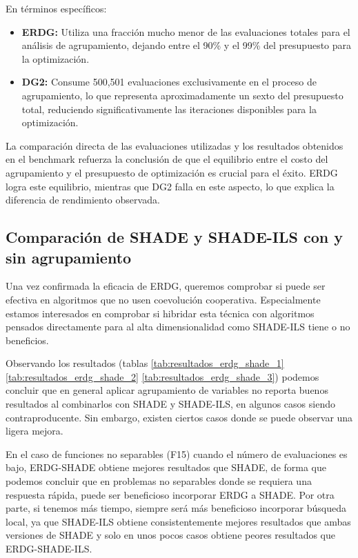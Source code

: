 En términos específicos:
\begin{itemize}
\item \textbf{ERDG:} Utiliza una fracción mucho menor de las evaluaciones totales para el análisis de agrupamiento, dejando entre el 90\% y el 99\% del presupuesto para la optimización.
\item \textbf{DG2:} Consume 500,501 evaluaciones exclusivamente en el proceso de agrupamiento, lo que representa aproximadamente un sexto del presupuesto total, reduciendo significativamente las iteraciones disponibles para la optimización.
\end{itemize}

La comparación directa de las evaluaciones utilizadas y los resultados obtenidos en el benchmark refuerza la conclusión de que el equilibrio entre el costo del agrupamiento y el presupuesto de optimización es crucial para el éxito. ERDG logra este equilibrio, mientras que DG2 falla en este aspecto, lo que explica la diferencia de rendimiento observada.

\subsection{Comparación de SHADE y SHADE-ILS con y sin agrupamiento}

Una vez confirmada la eficacia de ERDG, queremos comprobar si puede ser efectiva en algoritmos que no usen coevolución cooperativa. Especialmente estamos interesados en comprobar si hibridar esta técnica con algoritmos pensados directamente para al alta dimensionalidad como SHADE-ILS tiene o no beneficios.

Observando los resultados (tablas \ref{tab:resultados_erdg_shade_1} \ref{tab:resultados_erdg_shade_2} \ref{tab:resultados_erdg_shade_3}) podemos concluir que en general aplicar agrupamiento de variables no reporta buenos resultados al combinarlos con SHADE y SHADE-ILS, en algunos casos siendo contraproducente. Sin embargo, existen ciertos casos donde se puede observar una ligera mejora.

En el caso de funciones no separables (F15) cuando el número de evaluaciones es bajo, ERDG-SHADE obtiene mejores resultados que SHADE, de forma que podemos concluir que en problemas no separables donde se requiera una respuesta rápida, puede ser beneficioso incorporar ERDG a SHADE. Por otra parte, si tenemos más tiempo, siempre será más beneficioso incorporar búsqueda local, ya que SHADE-ILS  obtiene consistentemente mejores resultados que ambas versiones de SHADE y solo en unos pocos casos obtiene peores resultados que ERDG-SHADE-ILS. 

